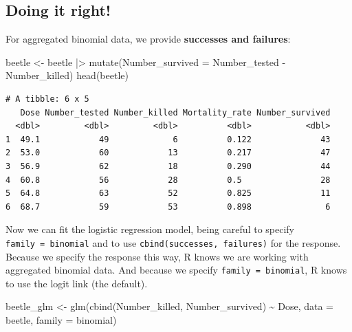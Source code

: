 \documentclass[
  letterpaper,
  8pt,
  a4paper]{book}
\newenvironment{Shaded}{\begin{snugshade}}{\end{snugshade}}
\newcommand{\AttributeTok}[1]{\textcolor[rgb]{0.40,0.45,0.13}{#1}}
\newcommand{\FunctionTok}[1]{\textcolor[rgb]{0.28,0.35,0.67}{#1}}
\newcommand{\NormalTok}[1]{\textcolor[rgb]{0.00,0.23,0.31}{#1}}
\newcommand{\OtherTok}[1]{\textcolor[rgb]{0.00,0.23,0.31}{#1}}
\newcommand{\SpecialCharTok}[1]{\textcolor[rgb]{0.37,0.37,0.37}{#1}}
\begin{document}
\subsection*{Doing it right!}\label{doing-it-right}

For aggregated binomial data, we provide \textbf{successes and
failures}:

\begin{Shaded}
\begin{Highlighting}[]
\NormalTok{beetle }\OtherTok{\textless{}{-}}\NormalTok{ beetle }\SpecialCharTok{|\textgreater{}}
  \FunctionTok{mutate}\NormalTok{(}\AttributeTok{Number\_survived =}\NormalTok{ Number\_tested }\SpecialCharTok{{-}}\NormalTok{ Number\_killed)}
\FunctionTok{head}\NormalTok{(beetle)}
\end{Highlighting}
\end{Shaded}

\begin{verbatim}
# A tibble: 6 x 5
   Dose Number_tested Number_killed Mortality_rate Number_survived
  <dbl>         <dbl>         <dbl>          <dbl>           <dbl>
1  49.1            49             6          0.122              43
2  53.0            60            13          0.217              47
3  56.9            62            18          0.290              44
4  60.8            56            28          0.5                28
5  64.8            63            52          0.825              11
6  68.7            59            53          0.898               6
\end{verbatim}

Now we can fit the logistic regression model, being careful to specify
\texttt{family\ =\ binomial} and to use
\texttt{cbind(successes,\ failures)} for the response. Because we
specify the response this way, R knows we are working with aggregated
binomial data. And because we specify \texttt{family\ =\ binomial}, R
knows to use the logit link (the default).

\begin{Shaded}
\begin{Highlighting}[]
\NormalTok{beetle\_glm }\OtherTok{\textless{}{-}} \FunctionTok{glm}\NormalTok{(}\FunctionTok{cbind}\NormalTok{(Number\_killed, Number\_survived) }\SpecialCharTok{\textasciitilde{}}\NormalTok{ Dose,}
                  \AttributeTok{data =}\NormalTok{ beetle, }\AttributeTok{family =}\NormalTok{ binomial)}
\end{Highlighting}
\end{Shaded}
\end{document}
